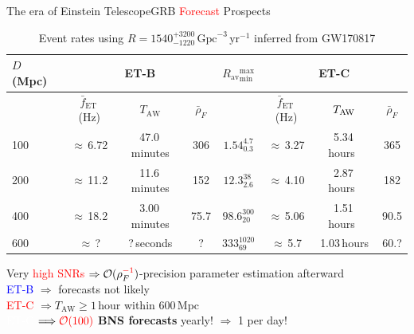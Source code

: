 \documentclass[xcolor=dvipsnames,handout,t]{beamer}
\newcommand{\red}[1]{\textcolor{red}{#1}}
\newcommand{\bl}[1]{\textcolor{blue}{#1}}
\newcommand{\ord}{\mathcal{O}}
\newcommand\T{\rule{0pt}{2.6ex}}       %
\newcommand\B{\rule[-1.2ex]{0pt}{0pt}} %
\begin{document}
\begin{frame}{The era of Einstein Telescope}{GRB \red{Forecast} Prospects} 
  \vspace{-8mm}
  \begin{footnotesize}
  \begin{table}[h]
  \centering
  \begin{tabular}{lccccccc}
  \hline\hline
  $D\,$(Mpc) & \multicolumn{3}{c}{ET-B} & $R_\text{av}{}^\text{max}_\text{min} $ & \multicolumn{3}{c}{ET-C}\T\B\\
  \hline
  {}& $\bar{f}_\text{ET}\,$(Hz) & \ \hspace{3mm} $T_\text{AW}$ \ \hspace{3mm} & $\bar{\rho}_{F}$ & {}  & $\bar{f}_\text{ET}\,$(Hz) & \ \hspace{3mm} $T_\text{AW}\hspace{3mm}$& $\bar{\rho}_{F}$\T\B\\
  100 & $\approx\,$6.72 &  47.0\,minutes & 306 & $ 1.54^{4.7}_{0.3}$ & $\approx\,$3.27 & 5.34\,hours\ & 365\T\\
  200 & $\approx\,$11.2 & 11.6\,minutes & 152 &  $ 12.3^{38}_{2.6} $ & $\approx\,$4.10 & 2.87\,hours\ & 182 \\
  400 & $\approx\,$18.2 & 3.00\,minutes & 75.7 &$ 98.6^{300}_{20} $ & $\approx\,$5.06 & 1.51\,hours\ & 90.5\\
  600 & $\approx\,$?  &?\,seconds & ?& $ 333^{1020}_{69} $ &    $\approx\,$5.7 & 1.03\,hours & 60.?  \\
  \hline\hline
  \end{tabular}
  \caption*{Event rates using $R=1540^{+3200}_{-1220}\,\text{Gpc}^{-3}\,\text{yr}^{-1}$ inferred from GW170817}
  \end{table}
  \end{footnotesize}
  \vspace{-3mm}
  Very \red{high SNRs} $\Rightarrow \ord(\rho_F^{\red{-1}})$-precision parameter estimation afterward \\
  \vspace{2mm}
  \bl{ET-B} $\Longrightarrow $ forecasts not likely \\
  \vspace{2mm}
  \red{ET-C} $\Longrightarrow T_\text{AW} \ge 1\,$hour within 600\,Mpc\\
  \vspace{1mm}
  \textcolor{white}{ET-C} $\Longrightarrow \red{\ord(100)}$ {\bf BNS forecasts} yearly! $\Rightarrow $ 1 per day!\\

\end{frame}
\end{document}
